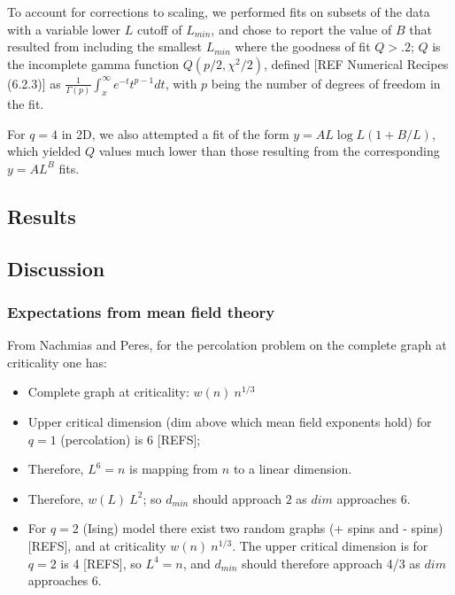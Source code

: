 \documentclass[pre,preprint]{revtex4}
\begin{document}
To account for corrections to scaling, we performed fits on subsets of the data with a variable lower $L$ cutoff of $L_{min}$, and chose to report the value of $B$ that resulted from including the smallest $L_{min}$ where the goodness of fit $Q>.2$; $Q$ is the incomplete gamma function $Q(p/2,\chi^2/2)$, defined [REF Numerical Recipes (6.2.3)] as $\frac{1}{\Gamma(p)}\int_x^{\infty}e^{-t}t^{p-1}dt$, with $p$ being the number of degrees of freedom in the fit. 

For $q=4$ in 2D, we also attempted a fit of the form $y=AL\log{L}(1+B/L)$, which yielded $Q$ values much lower than those resulting from the corresponding $y=AL^{B}$ fits.

\subsection{Results}

\subsection{Discussion}

\subsubsection {Expectations from mean field theory}

From Nachmias and Peres, for the percolation problem on the complete graph
at criticality one has:

\begin{itemize}
\item Complete graph at criticality: $w(n) ~ n^{1/3}$

\item Upper critical dimension (dim above which mean field exponents hold) for $q=1$ (percolation) is 6 [REFS];

\item Therefore, $L^6=n$ is mapping from $n$ to a linear dimension.  

\item Therefore, $w(L) ~ L^2$; so $d_{min}$ should approach $2$ as $dim$ approaches 6.

\item For $q=2$ (Ising) model there exist two random graphs (+ spins and - spins) [REFS], and at
criticality $w(n)~n^{1/3}$.  The upper critical dimension is for $q=2$ is 4 [REFS], so $L^4=n$, and $d_{min}$ should therefore approach 4/3 as $dim$ approaches 6. 
\end{itemize}
\end{document}
